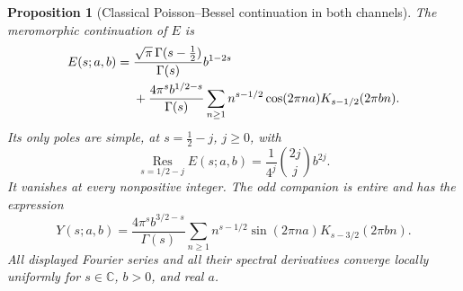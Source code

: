 \documentclass[11pt,letterpaper]{article}
\numberwithin{equation}{section}
\newtheorem{proposition}[theorem]{Proposition}
\theoremstyle{definition}
\newcommand{\C}{\mathbb C}
\begin{document}
\begin{proposition}[Classical Poisson--Bessel continuation in both channels]
\label{qspec:prop:poisson}
The meromorphic continuation of $E$ is
\begin{align}
E(s;a,b)={}&\frac{\sqrt\pi\,\Gamma(s-\tfrac12)}{\Gamma(s)}b^{1-2s}\notag\\
&+\frac{4\pi^s b^{1/2-s}}{\Gamma(s)}
\sum_{n\ge1}n^{s-1/2}\cos(2\pi na)K_{s-1/2}(2\pi bn).
\label{qspec:eq:poisson}
\end{align}
Its only poles are simple, at $s=\tfrac12-j$, $j\ge0$, with
\begin{equation}\label{qspec:eq:residues}
\operatorname*{Res}_{s=1/2-j} E(s;a,b)
=\frac1{4^j}\binom{2j}{j}b^{2j}.
\end{equation}
It vanishes at every nonpositive integer. The odd companion is entire and
has the expression
\begin{equation}\label{qspec:eq:odd-poisson}
Y(s;a,b)=\frac{4\pi^s b^{3/2-s}}{\Gamma(s)}
\sum_{n\ge1}n^{s-1/2}\sin(2\pi na)K_{s-3/2}(2\pi bn).
\end{equation}
All displayed Fourier series and all their spectral derivatives converge
locally uniformly for $s\in\C$, $b>0$, and real $a$.
\end{proposition}
\end{document}
